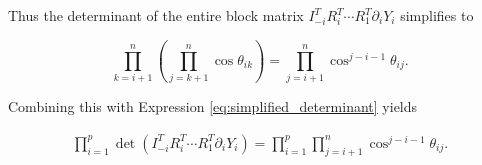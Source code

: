 \documentclass[ba]{imsart}
\numberwithin{equation}{section}
\theoremstyle{plain}
\begin{document}
\noindent Thus the determinant of the entire block matrix $I_{-i}^T R_i^T \cdots R_1^T \partial_{i} Y_i $ simplifies to

\begin{equation}
\prod_{k=i+1}^n \left( \prod_{j=k+1}^n \cos \theta_{ik} \right) = \prod_{j=i+1}^n \cos^{j-i-1} \theta_{ij}.
\end{equation}

\noindent Combining this with Expression \ref{eq:simplified_determinant} yields

\begin{eqnarray}
\prod_{i=1}^p \det \left( I_{-i}^T R_i^T \cdots R_1^T \partial_{i} Y_i \right) = \prod_{i=1}^p \prod_{j=i+1}^n \cos^{j-i-1} \theta_{ij}.
\end{eqnarray}



\end{document}
